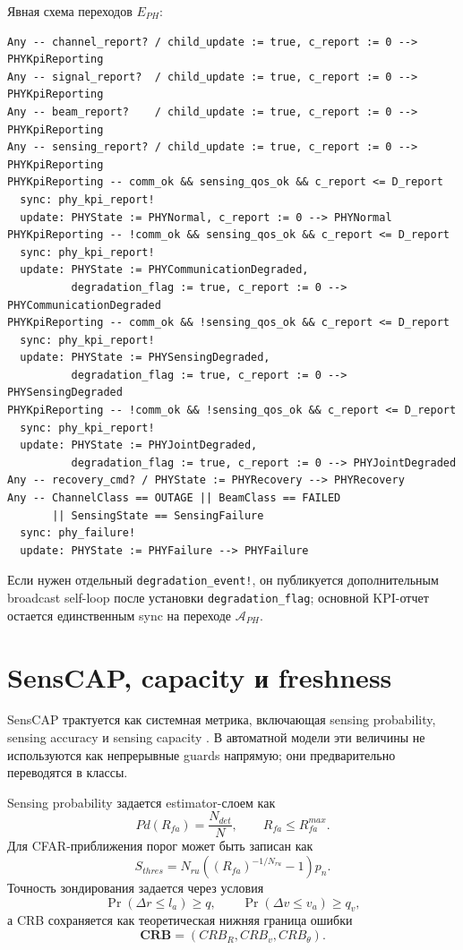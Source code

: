 \documentclass[10pt,a4paper]{article}
\newcommand{\code}[1]{\texttt{#1}}
\newcommand{\A}[1]{\mathcal{A}_{#1}}
\begin{document}
Явная схема переходов \(E_{PH}\):
\begin{verbatim}
Any -- channel_report? / child_update := true, c_report := 0 --> PHYKpiReporting
Any -- signal_report?  / child_update := true, c_report := 0 --> PHYKpiReporting
Any -- beam_report?    / child_update := true, c_report := 0 --> PHYKpiReporting
Any -- sensing_report? / child_update := true, c_report := 0 --> PHYKpiReporting
PHYKpiReporting -- comm_ok && sensing_qos_ok && c_report <= D_report
  sync: phy_kpi_report!
  update: PHYState := PHYNormal, c_report := 0 --> PHYNormal
PHYKpiReporting -- !comm_ok && sensing_qos_ok && c_report <= D_report
  sync: phy_kpi_report!
  update: PHYState := PHYCommunicationDegraded,
          degradation_flag := true, c_report := 0 --> PHYCommunicationDegraded
PHYKpiReporting -- comm_ok && !sensing_qos_ok && c_report <= D_report
  sync: phy_kpi_report!
  update: PHYState := PHYSensingDegraded,
          degradation_flag := true, c_report := 0 --> PHYSensingDegraded
PHYKpiReporting -- !comm_ok && !sensing_qos_ok && c_report <= D_report
  sync: phy_kpi_report!
  update: PHYState := PHYJointDegraded,
          degradation_flag := true, c_report := 0 --> PHYJointDegraded
Any -- recovery_cmd? / PHYState := PHYRecovery --> PHYRecovery
Any -- ChannelClass == OUTAGE || BeamClass == FAILED
       || SensingState == SensingFailure
  sync: phy_failure!
  update: PHYState := PHYFailure --> PHYFailure
\end{verbatim}
Если нужен отдельный \code{degradation\_event!}, он публикуется дополнительным broadcast self-loop после установки \code{degradation\_flag}; основной KPI-отчет остается единственным sync на переходе \(\A{PH}\).

\section{SensCAP, capacity и freshness}

SensCAP трактуется как системная метрика, включающая sensing probability, sensing accuracy и sensing capacity \cite{liu2024senscap,liu2026cooperative}. В автоматной модели эти величины не используются как непрерывные guards напрямую; они предварительно переводятся в классы.

Sensing probability задается estimator-слоем как
\begin{equation}
Pd(R_{fa})=\frac{N_{det}}{N},\qquad R_{fa}\le R_{fa}^{max}.
\end{equation}
Для CFAR-приближения порог может быть записан как
\begin{equation}
S_{thres}=N_{ru}\left((R_{fa})^{-1/N_{ru}}-1\right)p_n.
\end{equation}
Точность зондирования задается через условия
\begin{equation}
\Pr(\Delta r\le l_a)\ge q,\qquad \Pr(\Delta v\le v_a)\ge q_v,
\end{equation}
а CRB сохраняется как теоретическая нижняя граница ошибки
\begin{equation}
\mathbf{CRB}=(CRB_R,CRB_v,CRB_\theta).
\end{equation}
\end{document}
